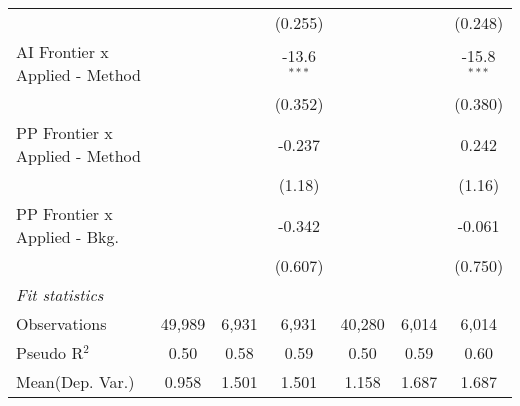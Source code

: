 \begin{tabular}{lcccccc}
                                  &                &                & (0.255)        &                &                & (0.248)\\   
   AI Frontier x Applied - Method &                &                & -13.6$^{***}$  &                &                & -15.8$^{***}$\\   
                                  &                &                & (0.352)        &                &                & (0.380)\\   
   PP Frontier x Applied - Method &                &                & -0.237         &                &                & 0.242\\   
                                  &                &                & (1.18)         &                &                & (1.16)\\   
   PP Frontier x Applied - Bkg.   &                &                & -0.342         &                &                & -0.061\\   
                                  &                &                & (0.607)        &                &                & (0.750)\\   
   \midrule
   \emph{Fit statistics}\\
   Observations                   & 49,989         & 6,931          & 6,931          & 40,280         & 6,014          & 6,014\\  
   Pseudo R$^2$                   & 0.50           & 0.58           & 0.59           & 0.50           & 0.59           & 0.60\\  
Mean(Dep. Var.) & 0.958 & 1.501 & 1.501 & 1.158 & 1.687 & 1.687 \\
   

\end{tabular}
